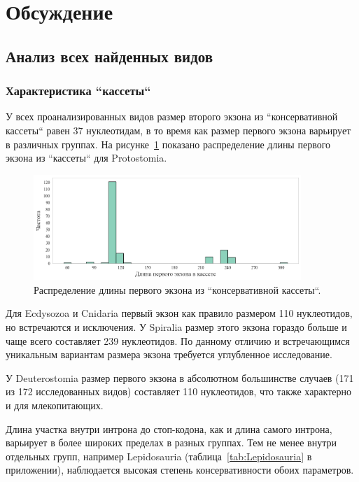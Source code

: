 \clearpage
\section{Обсуждение}

\subsection{Анализ всех найденных видов}

\subsubsection{Характеристика ``кассеты``}

У всех проанализированных видов размер второго экзона из ``консервативной кассеты`` равен 37 нуклеотидам, в то время как размер первого экзона варьирует в различных группах.
На рисунке~\ref{fig:Protostomia_exon} показано распределение длины первого экзона из ``кассеты`` для Protostomia.

\begin{figure}[h] %
    \centering
    \includegraphics[width=0.9\textwidth]{images/Protostomia_exon}
    \caption{Распределение длины первого экзона из ``консервативной кассеты``.}
    \label{fig:Protostomia_exon}
\end{figure}

Для Ecdysozoa и Cnidaria первый экзон как правило размером 110 нуклеотидов, но встречаются и исключения.
У Spiralia размер этого экзона гораздо больше и чаще всего составляет 239 нуклеотидов.
По данному отличию и встречающимся уникальным вариантам размера экзона требуется углубленное исследование.

У Deuterostomia размер первого экзона в абсолютном большинстве случаев (171 из 172 исследованных видов) составляет 110 нуклеотидов, что также характерно и для млекопитающих.

Длина участка внутри интрона до стоп-кодона, как и длина самого интрона, варьирует в более широких пределах в разных группах.
Тем не менее внутри отдельных групп, например Lepidosauria (таблица~\ref{tab:Lepidosauria} в приложении), наблюдается высокая степень консервативности обоих параметров.


